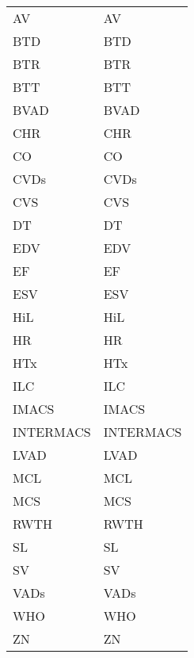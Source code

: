 \begin{tabularx}{\textwidth}{p{}X}
\acs{AV} & \acl{AV} \\
\acs{BTD} & \acl{BTD} \\
\acs{BTR} & \acl{BTR} \\
\acs{BTT} & \acl{BTT} \\
\acs{BVAD} & \acl{BVAD} \\
\acs{CHR} & \acl{CHR} \\
\acs{CO} & \acl{CO} \\
\acs{CVDs} & \acl{CVDs} \\
\acs{CVS} & \acl{CVS} \\
\acs{DT} & \acl{DT} \\
\acs{EDV} & \acl{EDV} \\
\acs{EF} & \acl{EF} \\
\acs{ESV} & \acl{ESV} \\
\acs{HiL} & \acl{HiL} \\
\acs{HR} & \acl{HR} \\
\acs{HTx} & \acl{HTx} \\
\acs{ILC} & \acl{ILC} \\
\acs{IMACS} & \acl{IMACS}\\
\acs{INTERMACS} & \acl{INTERMACS}\\
\acs{LVAD} & \acl{LVAD} \\
\acs{MCL} & \acl{MCL} \\
\acs{MCS} & \acl{MCS} \\
\acs{RWTH} & \acl{RWTH}\\
\acs{SL} & \acl{SL}\\
\acs{SV} & \acl{SV} \\
\acs{VADs} & \acl{VADs} \\
\acs{WHO} & \acl{WHO} \\
\acs{ZN} & \acl{ZN} \\
\end{tabularx}
%
%
%

